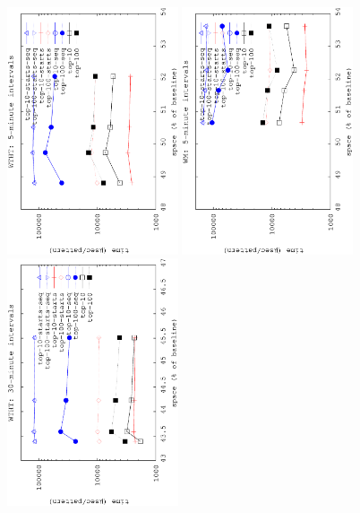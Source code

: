 \begin{figure}[!ht]
\begin{center}
			{\includegraphics[angle=-90,width=0.45\textwidth]{figures_synt/porto_st_topk_ht_5.eps}}
			{\includegraphics[angle=-90,width=0.45\textwidth]{figures_synt/porto_st_topk_wm_5.eps}}
			{\includegraphics[angle=-90,width=0.45\textwidth]{figures_synt/porto_st_topk_ht_30.eps}}

\end{center}
\end{figure}
